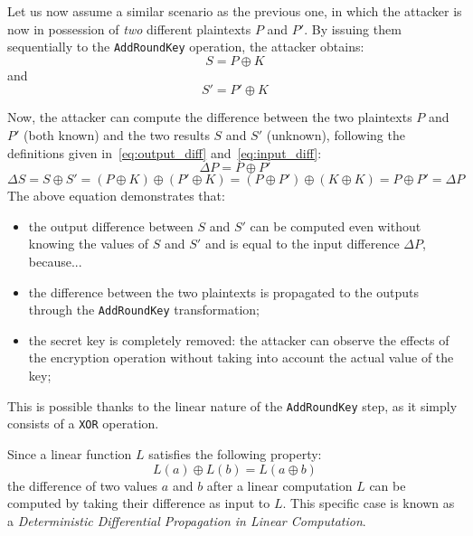                Let us now assume a similar scenario as the previous one, in which the attacker is now in possession of \emph{two} different plaintexts $P$ and $P'$. By issuing them sequentially to the \texttt{AddRoundKey} operation, the attacker obtains:
                \begin{equation}
                    S = P \oplus K
                \end{equation}
                and
                \begin{equation}
                    S' = P' \oplus K
                \end{equation}

                Now, the attacker can compute the difference between the two plaintexts $P$ and $P'$ (both known) and the two results $S$ and $S'$ (unknown), following the definitions given in~\ref{eq:output_diff} and~\ref{eq:input_diff}:
                \begin{equation}
                    \Delta P = P \oplus P'
                \end{equation}
                \begin{equation}\label{eq:addroundkey_res}
                    \Delta S = S \oplus S' = (P \oplus K) \oplus (P' \oplus K) = (P \oplus P') \oplus (K \oplus K) = P \oplus P' = \Delta P
                \end{equation}
                The above equation demonstrates that:
                \begin{itemize}
                    \item the output difference between $S$ and $S'$ can be computed even without knowing the values of $S$ and $S'$ and is equal to the input difference $\Delta P$, because...
                    \item the difference between the two plaintexts is propagated to the outputs through the \texttt{AddRoundKey} transformation;
                    \item the secret key is completely removed: the attacker can observe the effects of the encryption operation without taking into account the actual value of the key;
                \end{itemize}
                
                This is possible thanks to the linear nature of the \texttt{AddRoundKey} step, as it simply consists of a \texttt{XOR} operation.

                Since a linear function $L$ satisfies the following property:
                \begin{equation}\label{eq:diff_crypt_lin}
                    L(a) \oplus L(b) = L(a \oplus b)
                \end{equation}
                the difference of two values $a$ and $b$ after a linear computation $L$ can be computed by taking their difference as input to $L$. This specific case is known as a \emph{Deterministic Differential Propagation in Linear Computation}. 
                
